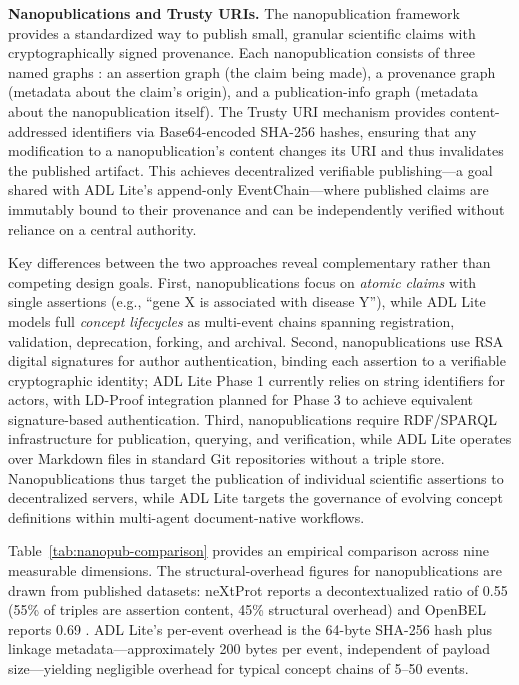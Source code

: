 \textbf{Nanopublications and Trusty URIs.} The nanopublication framework \cite{ref40} provides a standardized way to publish small, granular scientific claims with cryptographically signed provenance. Each nanopublication consists of three named graphs \cite{ref41}: an assertion graph (the claim being made), a provenance graph (metadata about the claim's origin), and a publication-info graph (metadata about the nanopublication itself). The Trusty URI mechanism \cite{ref42} provides content-addressed identifiers via Base64-encoded SHA-256 hashes, ensuring that any modification to a nanopublication's content changes its URI and thus invalidates the published artifact. This achieves decentralized verifiable publishing---a goal shared with ADL Lite's append-only EventChain---where published claims are immutably bound to their provenance and can be independently verified without reliance on a central authority.

Key differences between the two approaches reveal complementary rather than competing design goals. First, nanopublications focus on \emph{atomic claims} with single assertions (e.g., ``gene X is associated with disease Y''), while ADL Lite models full \emph{concept lifecycles} as multi-event chains spanning registration, validation, deprecation, forking, and archival. Second, nanopublications use RSA digital signatures for author authentication, binding each assertion to a verifiable cryptographic identity; ADL Lite Phase 1 currently relies on string identifiers for actors, with LD-Proof integration planned for Phase 3 to achieve equivalent signature-based authentication. Third, nanopublications require RDF/SPARQL infrastructure for publication, querying, and verification, while ADL Lite operates over Markdown files in standard Git repositories without a triple store. Nanopublications thus target the publication of individual scientific assertions to decentralized servers, while ADL Lite targets the governance of evolving concept definitions within multi-agent document-native workflows.

Table~\ref{tab:nanopub-comparison} provides an empirical comparison across nine measurable dimensions. The structural-overhead figures for nanopublications are drawn from published datasets: neXtProt reports a decontextualized ratio of 0.55 (55\% of triples are assertion content, 45\% structural overhead) and OpenBEL reports 0.69 \cite{ref40,ref41,ref42}. ADL Lite's per-event overhead is the 64-byte SHA-256 hash plus linkage metadata---approximately 200 bytes per event, independent of payload size---yielding negligible overhead for typical concept chains of 5--50 events.

